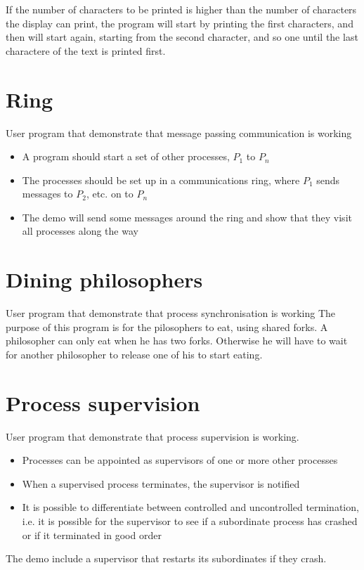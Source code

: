 If the number of characters to be printed is higher than the number of characters the display
can print, the program will start by printing the first characters, and then will start again,
starting from the second character, and so one until the last charactere of the text is printed
first.

\section{Ring}
User program that demonstrate that message passing communication is working
\begin{itemize}
	\item{A program should start a set of other processes, $P_1$ to $P_n$}
	\item{The processes should be set up in a communications ring, where $P_1$ sends messages to $P_2$, etc. on to $P_n$}
	\item{The demo will send some messages around the ring and show that they visit all processes along the way}
\end{itemize}

\section{Dining philosophers}
User program that demonstrate that process synchronisation is working
The purpose of this program is for the pilosophers to eat, using shared forks.
A philosopher can only eat when he has two forks. Otherwise he will have to wait
for another philosopher to release one of his to start eating.

\section{Process supervision}
User program that demonstrate that process supervision is working.
\begin{itemize}
	\item{Processes can be appointed as supervisors of one or more other processes}
	\item{When a supervised process terminates, the supervisor is notified}
	\item{It is possible to differentiate between controlled and uncontrolled termination,
	  i.e. it is possible for the supervisor to see if a subordinate process has crashed
	  or if it terminated in good order}
\end{itemize}
The demo include a supervisor that restarts its subordinates if they crash.

